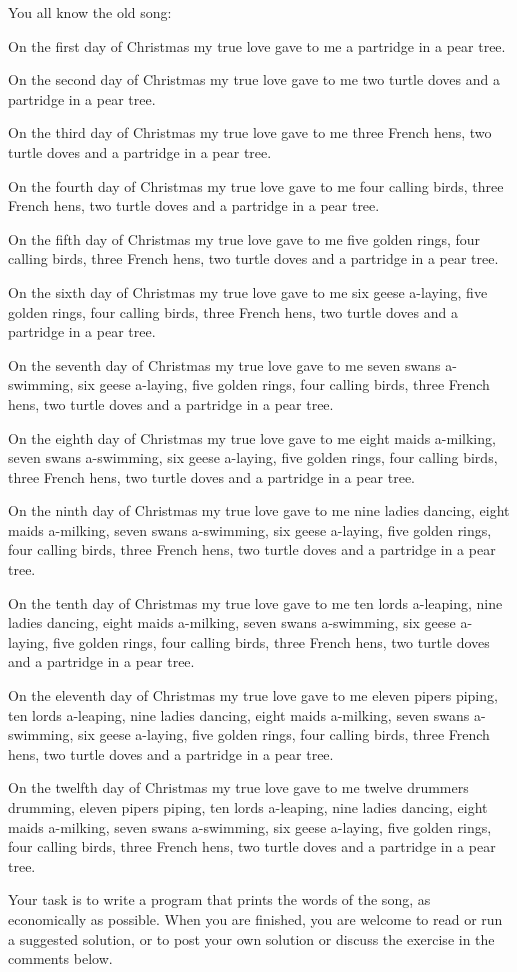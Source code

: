 You all know the old song:


\hskip 1cm On the first day of Christmas my true love gave to me a partridge in a pear tree.

\hskip 1cm On the second day of Christmas my true love gave to me two turtle doves and a partridge in a pear tree.

\hskip 1cm On the third day of Christmas my true love gave to me three French hens, two turtle doves and a partridge in a pear tree.

\hskip 1cm On the fourth day of Christmas my true love gave to me four calling birds, three French hens, two turtle doves and a partridge in a pear tree.

\hskip 1cm On the fifth day of Christmas my true love gave to me five golden rings, four calling birds, three French hens, two turtle doves and a partridge in a pear tree.

\hskip 1cm On the sixth day of Christmas my true love gave to me six geese a-laying, five golden rings, four calling birds, three French hens, two turtle doves and a partridge in a pear tree.

\hskip 1cm On the seventh day of Christmas my true love gave to me seven swans a-swimming, six geese a-laying, five golden rings, four calling birds, three French hens, two turtle doves and a partridge in a pear tree.

\hskip 1cm On the eighth day of Christmas my true love gave to me eight maids a-milking, seven swans a-swimming, six geese a-laying, five golden rings, four calling birds, three French hens, two turtle doves and a partridge in a pear tree.

\hskip 1cm On the ninth day of Christmas my true love gave to me nine ladies dancing, eight maids a-milking, seven swans a-swimming, six geese a-laying, five golden rings, four calling birds, three French hens, two turtle doves and a partridge in a pear tree.

\hskip 1cm On the tenth day of Christmas my true love gave to me ten lords a-leaping, nine ladies dancing, eight maids a-milking, seven swans a-swimming, six geese a-laying, five golden rings, four calling birds, three French hens, two turtle doves and a partridge in a pear tree.

\hskip 1cm On the eleventh day of Christmas my true love gave to me eleven pipers piping, ten lords a-leaping, nine ladies dancing, eight maids a-milking, seven swans a-swimming, six geese a-laying, five golden rings, four calling birds, three French hens, two turtle doves and a partridge in a pear tree.

\hskip 1cm On the twelfth day of Christmas my true love gave to me twelve drummers drumming, eleven pipers piping, ten lords a-leaping, nine ladies dancing, eight maids a-milking, seven swans a-swimming, six geese a-laying, five golden rings, four calling birds, three French hens, two turtle doves and a partridge in a pear tree.

Your task is to write a program that prints the words of the song, as economically as possible. When you are finished, you are welcome to read or run a suggested solution, or to post your own solution or discuss the exercise in the comments below.


\bye